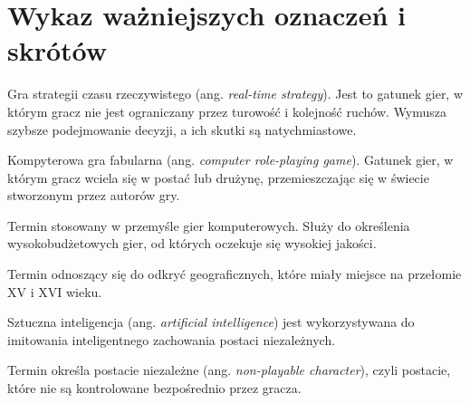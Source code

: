 \chapter*{Wykaz ważniejszych oznaczeń i skrótów}
\begin{description}[style=multiline,leftmargin=3cm]
\item[RTS] Gra strategii czasu rzeczywistego (ang. \textit{real-time strategy}). Jest to gatunek gier, w którym gracz nie jest
ograniczany przez turowość i kolejność ruchów. Wymusza szybsze podejmowanie decyzji, a ich skutki są natychmiastowe.
\item[cRPG] Kompyterowa gra fabularna (ang. \textit{computer role-playing game}). Gatunek gier, w którym gracz wciela
się w postać lub drużynę, przemieszczając się w świecie stworzonym przez autorów gry.
\item[AAA (Triple-A)] Termin stosowany w przemyśle gier komputerowych. Służy do określenia wysokobudżetowych gier, od
których oczekuje się wysokiej jakości.
\item[Wielkie odkrycia geograficzne] Termin odnoszący się do odkryć geograficznych, które miały miejsce na przełomie XV
i XVI wieku.
\item[AI] Sztuczna inteligencja (ang. \textit{artificial intelligence}) jest wykorzystywana do imitowania inteligentnego
zachowania postaci niezależnych.
\item[NPC] Termin określa postacie niezależne (ang. \textit{non-playable character}), czyli postacie, które nie są kontrolowane bezpośrednio
przez gracza.
\end{description}
